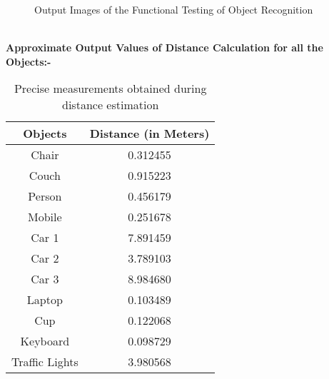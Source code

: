 \documentclass[MScCS]{uccthesis}
\begin{document}
   \begin{figure}[H]
    \centering
    \hfill
    \hfill
    \hfill
    \hfill
    \hfill
    \caption{Output Images of the Functional Testing of Object Recognition}
\end{figure}
\newpage\textbf{\\Approximate Output Values of Distance Calculation for all the Objects:-}
   
\begin{table}
  \centering
  \begin{tabular}{|c|c|}
    \hline
    \textbf{Objects} & \textbf{Distance (in Meters)}  \\
    \hline
    Chair & 0.312455  \\
    \hline
    Couch & 0.915223  \\
    \hline
    Person & 0.456179  \\
    \hline
    Mobile & 0.251678  \\
    \hline
    Car 1 & 7.891459  \\
    \hline
    Car 2 & 3.789103  \\
    \hline
    Car 3 & 8.984680  \\
    \hline
    Laptop & 0.103489  \\
    \hline
    Cup & 0.122068  \\
    \hline
    Keyboard & 0.098729  \\
    \hline
    Traffic Lights & 3.980568  \\
    \hline
  \end{tabular}
  \caption{Precise measurements obtained during distance estimation}
\end{table}
\end{document}
